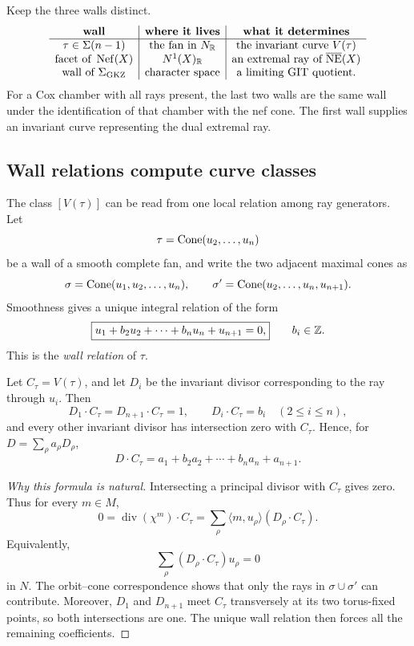\begin{agcheatsheet}
Keep the three walls distinct.
\[
\begin{array}{c|c|c}
\textbf{wall}&\textbf{where it lives}&\textbf{what it determines}
\\
\hline
\tau\in\Sigma(n-1)
&\text{the fan in }N_{\mathbb{R}}
&\text{the invariant curve }V(\tau)
\\
\text{facet of }\operatorname{Nef}(X)
&N^1(X)_{\mathbb{R}}
&\text{an extremal ray of }\overline{\operatorname{NE}}(X)
\\
\text{wall of }\Sigma_{\mathrm{GKZ}}
&\text{character space}
&\text{a limiting GIT quotient.}
\end{array}
\]
For a Cox chamber with all rays present, the last two walls are the
same wall under the identification of that chamber with the nef cone.
The first wall supplies an invariant curve representing the dual
extremal ray.
\end{agcheatsheet}

\subsection{Wall relations compute curve classes}

The class \([V(\tau)]\) can be read from one local relation among ray
generators.  Let
\[
\tau=\operatorname{Cone}(u_2,\dots,u_n)
\]
be a wall of a smooth complete fan, and write the two adjacent maximal
cones as
\[
\sigma=\operatorname{Cone}(u_1,u_2,\dots,u_n),
\qquad
\sigma'=\operatorname{Cone}(u_2,\dots,u_n,u_{n+1}).
\]
Smoothness gives a unique integral relation of the form
\[
\boxed{
u_1+b_2u_2+\cdots+b_nu_n+u_{n+1}=0,}
\qquad b_i\in\mathbb{Z}.
\]
This is the \emph{wall relation} of \(\tau\).

\begin{proposition}
\label{prop:wall-relation-intersections}
Let \(C_\tau=V(\tau)\), and let \(D_i\) be the invariant divisor
corresponding to the ray through \(u_i\).  Then
\[
D_1\cdot C_\tau=D_{n+1}\cdot C_\tau=1,
\qquad
D_i\cdot C_\tau=b_i
\quad(2\leq i\leq n),
\]
and every other invariant divisor has intersection zero with
\(C_\tau\).  Hence, for
\(D=\sum_\rho a_\rho D_\rho\),
\[
\boxed{
D\cdot C_\tau
=
a_1+b_2a_2+\cdots+b_na_n+a_{n+1}.}
\]
\end{proposition}

\begin{proof}[Why this formula is natural]
Intersecting a principal divisor with \(C_\tau\) gives zero.  Thus for
every \(m\in M\),
\[
0
=
\operatorname{div}(\chi^m)\cdot C_\tau
=
\sum_\rho
\langle m,u_\rho\rangle(D_\rho\cdot C_\tau).
\]
Equivalently,
\[
\sum_\rho(D_\rho\cdot C_\tau)u_\rho=0
\]
in \(N\).  The orbit--cone correspondence shows that only the rays in
\(\sigma\cup\sigma'\) can contribute.  Moreover, \(D_1\) and
\(D_{n+1}\) meet \(C_\tau\) transversely at its two torus-fixed
points, so both intersections are one.  The unique wall relation then
forces all the remaining coefficients.
\end{proof}


